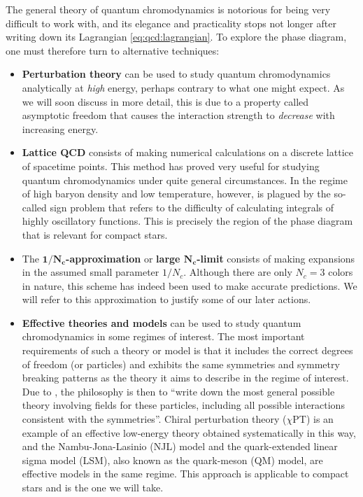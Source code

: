 The general theory of quantum chromodynamics is notorious for being very difficult to work with,
and its elegance and practicality stops not longer after writing down its Lagrangian \eqref{eq:qcd:lagrangian}.
To explore the phase diagram, one must therefore turn to alternative techniques:
\begin{itemize}
\item \textbf{Perturbation theory} can be used to study quantum chromodynamics analytically at \emph{high} energy, perhaps contrary to what one might expect.
      As we will soon discuss in more detail, this is due to a property called asymptotic freedom that causes the interaction strength to \emph{decrease} with increasing energy.
\item \textbf{Lattice QCD} consists of making numerical calculations on a discrete lattice of spacetime points.
      This method has proved very useful for studying quantum chromodynamics under quite general circumstances.
      In the regime of high baryon density and low temperature, however, is plagued by the so-called sign problem that refers to the difficulty of calculating integrals of highly oscillatory functions.
      This is precisely the region of the phase diagram that is relevant for compact stars.
\item The \textbf{$\bm{1/N_c}$-approximation} or \textbf{large $\bm{N_c}$-limit} consists of making expansions in the assumed small parameter $1/N_c$.
      Although there are only $N_c = 3$ colors in nature, this scheme has indeed been used to make accurate predictions.
      We will refer to this approximation to justify some of our later actions.
\item \textbf{Effective theories and models} can be used to study quantum chromodynamics in some regimes of interest.
      The most important requirements of such a theory or model is that it includes the correct degrees of freedom (or particles) and exhibits the same symmetries and symmetry breaking patterns as the theory it aims to describe in the regime of interest.
      Due to \cite{ref:weinberg_eft}, the philosophy is then to ``write down the most general possible theory involving fields for these particles, including all possible interactions consistent with the symmetries''.
      Chiral perturbation theory ($\chi$PT) is an example of an effective low-energy theory obtained systematically in this way,
      and the Nambu-Jona-Lasinio (NJL) model and the quark-extended linear sigma model (LSM), also known as the quark-meson (QM) model, are effective models in the same regime.
      This approach is applicable to compact stars and is the one we will take.
\end{itemize}

